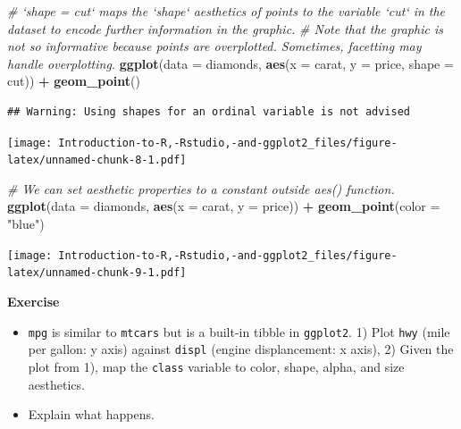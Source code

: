 \documentclass[]{book}
\newenvironment{Shaded}{\begin{snugshade}}{\end{snugshade}}
\newcommand{\CommentTok}[1]{\textcolor[rgb]{0.56,0.35,0.01}{\textit{#1}}}
\newcommand{\DataTypeTok}[1]{\textcolor[rgb]{0.13,0.29,0.53}{#1}}
\newcommand{\KeywordTok}[1]{\textcolor[rgb]{0.13,0.29,0.53}{\textbf{#1}}}
\newcommand{\NormalTok}[1]{#1}
\newcommand{\OperatorTok}[1]{\textcolor[rgb]{0.81,0.36,0.00}{\textbf{#1}}}
\newcommand{\StringTok}[1]{\textcolor[rgb]{0.31,0.60,0.02}{#1}}
\begin{document}
\begin{Shaded}
\begin{Highlighting}[]
\CommentTok{# `shape = cut` maps the `shape` aesthetics of points to the variable `cut` in the dataset to encode further information in the graphic. }
\CommentTok{# Note that the graphic is not so informative because points are overplotted. Sometimes, facetting may handle overplotting.  }
\KeywordTok{ggplot}\NormalTok{(}\DataTypeTok{data =}\NormalTok{ diamonds, }\KeywordTok{aes}\NormalTok{(}\DataTypeTok{x =}\NormalTok{ carat, }\DataTypeTok{y =}\NormalTok{ price, }\DataTypeTok{shape =}\NormalTok{ cut)) }\OperatorTok{+}\StringTok{ }\KeywordTok{geom_point}\NormalTok{()}
\end{Highlighting}
\end{Shaded}

\begin{verbatim}
## Warning: Using shapes for an ordinal variable is not advised
\end{verbatim}

\texttt{[image: Introduction-to-R,-Rstudio,-and-ggplot2\_files/figure-latex/unnamed-chunk-8-1.pdf]}

\begin{Shaded}
\begin{Highlighting}[]
\CommentTok{# We can set aesthetic properties to a constant outside aes() function. }
\KeywordTok{ggplot}\NormalTok{(}\DataTypeTok{data =}\NormalTok{ diamonds, }\KeywordTok{aes}\NormalTok{(}\DataTypeTok{x =}\NormalTok{ carat, }\DataTypeTok{y =}\NormalTok{ price)) }\OperatorTok{+}\StringTok{ }\KeywordTok{geom_point}\NormalTok{(}\DataTypeTok{color =} \StringTok{"blue"}\NormalTok{)}
\end{Highlighting}
\end{Shaded}

\texttt{[image: Introduction-to-R,-Rstudio,-and-ggplot2\_files/figure-latex/unnamed-chunk-9-1.pdf]}

\textbf{Exercise}

\begin{itemize}
\item
  \texttt{mpg} is similar to \texttt{mtcars} but is a built-in tibble in \texttt{ggplot2}. 1) Plot \texttt{hwy} (mile per gallon: y axis) against \texttt{displ} (engine displancement: x axis), 2) Given the plot from 1), map the \texttt{class} variable to color, shape, alpha, and size aesthetics.
\item
  Explain what happens.
\end{itemize}
\end{document}
